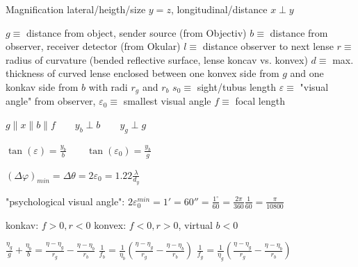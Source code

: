 
Magnification lateral/heigth/size $y=z$, longitudinal/distance $x \perp y$

\vspace{1ex} \noindent
$ g \equiv $ distance from object, sender source (from Objectiv)
\newline
$ b \equiv $ distance from observer, receiver detector (from Okular)
\newline
$ l \equiv $ distance observer to next lense
\newline
$ r \equiv $ radius of curvature (bended reflective surface, lense koncav vs. konvex)
\newline
$ d \equiv $ max. thickness of curved lense enclosed between one konvex side from $g$ and one konkav side from $b$ with radi $r_g$ and $r_b$
\newline
$ s_0 \equiv $ sight/tubus length
\newline
$ \varepsilon \equiv $ "visual angle" from observer, $ \varepsilon_0 \equiv $ smallest visual angle
\newline
$ f \equiv $ focal length


\vspace{5ex} \noindent
$
g \parallel x \parallel b \parallel f 
\qquad
y_b \perp b	
\qquad	
y_g \perp g
$

\vspace{2ex} \noindent
$
\tan(\varepsilon) = \frac{y_b}{b}
\qquad
\tan(\varepsilon_0) = \frac{y_b}{g}
$

\vspace{2ex} \noindent
$
(\Delta\varphi)_{min} = \Delta\theta = 2 \varepsilon_0 = 1.22 \frac{\lambda}{d_y} 
$

\vspace{2ex} \noindent
"psychological visual angle":
$
2 \varepsilon_0^{min} = 1' = 60'' = \frac{1^{\circ}}{60} = \frac{2\pi}{360} \frac{1}{60} = \frac{\pi}{10800}
$

\vspace{2ex} \noindent
konkav: $ f>0, r<0 $	\qquad	konvex: $ f<0, r>0 $, virtual $ b<0 $


\vspace{5ex} \noindent
$
\frac{\eta_g}{g} + \frac{\eta_b}{b} = 
\frac{\eta - \eta_g}{r_g} - \frac{\eta - \eta_b}{r_b}
$
\newline \vspace{2ex}
$
\frac{1}{f_b} = \frac{1}{\eta_b} \left( \frac{\eta - \eta_g}{r_g} - \frac{\eta - \eta_b}{r_b} \right)
$
\newline \vspace{2ex}
$
\frac{1}{f_g} = \frac{1}{\eta_g} \left( \frac{\eta - \eta_g}{r_g} - \frac{\eta - \eta_b}{r_b} \right)
$
\newline \vspace{2ex}

